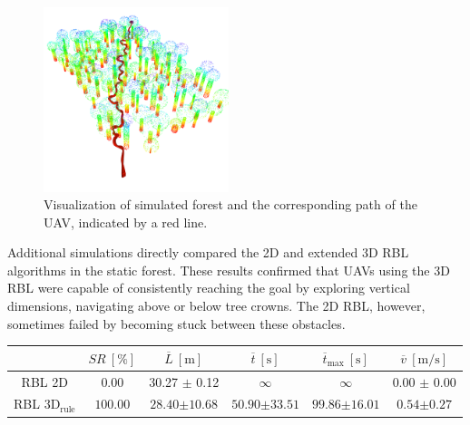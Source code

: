             \begin{figure}[H]
                \centering
                \includegraphics[width=0.48\textwidth]{./fig/rviz/simulation_forest.png}
                \caption{
                    Visualization of simulated forest and the corresponding path of the \ac{UAV}, indicated by a red line.
                }
                \label{fig:simulated_forest_path}
            \end{figure}

            Additional simulations directly compared the 2D and extended 3D \ac{RBL} algorithms in the static forest. 
            These results confirmed that \ac{UAV}s using the 3D \ac{RBL} were capable of consistently reaching the goal by exploring vertical dimensions, navigating above or below tree crowns. 
            The 2D \ac{RBL}, however, sometimes failed by becoming stuck between these obstacles.
            \begin{table}[H]
                \centering
                \renewcommand{\arraystretch}{1.2}
                \begin{tabular}{|c|c|c|c|c|c|}
                \hline
                                                    & \( SR \ [\%] \)   & \( \overline{L} \ [\mathrm{m}] \)                & \( \overline{t} \ [\mathrm{s}] \)                & \( \overline{t}_{\text{max}} \ [\mathrm{s}] \)    &   \( \overline{v} \ [\mathrm{m/s}] \)     \\ \hline
                \ac{RBL} 2D                         & 0.00              & 30.27 $\pm$ 0.12                                 & $\infty$                                         &  $\infty$                                         &  0.00 $\pm$ 0.00                         \\ \hline
                \ac{RBL} $\text{3D}_{\text{rule}}$  & $\mathbf{100.00}$ & $\mathbf{28.40} \boldsymbol{\pm} \mathbf{10.68}$ & $\mathbf{50.90} \boldsymbol{\pm} \mathbf{33.51}$ &  $\mathbf{99.86} \boldsymbol{\pm} \mathbf{16.01}$ &  $\mathbf{0.54} \boldsymbol{\pm} \mathbf{0.27}$                         \\ \hline
                \end{tabular}
            \end{table}

